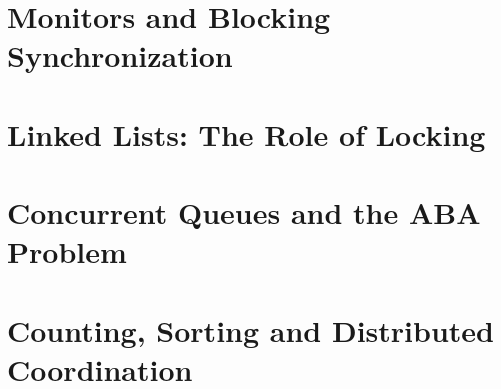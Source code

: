\documentclass[letter,12pt]{report}
\begin{document}
\chapter{Monitors and Blocking Synchronization}


\chapter{Linked Lists: The Role of Locking}


%
%

\chapter{Concurrent Queues and the ABA Problem}




\chapter{Counting, Sorting and Distributed Coordination}

\end{document}
